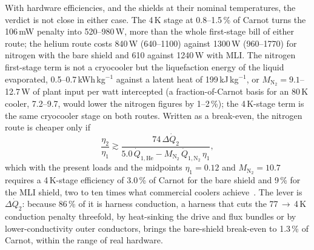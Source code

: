 \documentclass[preprint,12pt]{elsarticle}
\begin{document}
With hardware efficiencies, and the shields at their nominal temperatures, the verdict is not
close in either case. The 4\,K stage at 0.8--1.5\,\% of Carnot turns the 106\,mW penalty into
520--980\,W, more than the whole first-stage bill of either route; the helium route costs
840\,W (640--1100) against 1300\,W (960--1770) for nitrogen with the bare shield and 610
against 1240\,W with MLI. The nitrogen first-stage term is not a cryocooler but the
liquefaction energy of the liquid evaporated, 0.5--0.7\,kWh\,kg$^{-1}$ against a latent heat
of 199\,kJ\,kg$^{-1}$, or $M_{\mathrm{N_2}}=9.1$--12.7\,W of plant input per watt intercepted
(a fraction-of-Carnot basis for an 80\,K cooler, 7.2--9.7, would lower the nitrogen figures by
1--2\,\%); the 4\,K-stage term is the same cryocooler stage on both routes. Written as a
break-even, the nitrogen route is cheaper only if
\begin{equation}
\frac{\eta_2}{\eta_1}\gtrsim\frac{74\,\Delta\dot Q_2}{5.0\,\dot Q_{1,\mathrm{He}}-M_{\mathrm{N_2}}\,\dot Q_{1,\mathrm{N_2}}\,\eta_1},
\label{eq:breakeven}
\end{equation}
which with the present loads and the midpoints $\eta_1=0.12$ and $M_{\mathrm{N_2}}=10.7$
requires a 4\,K-stage efficiency of 3.0\,\% of Carnot for the bare shield and 9\,\% for the
MLI shield, two to ten times what commercial coolers achieve~\cite{Radebaugh2009Cryocoolers}.
The lever is $\Delta\dot Q_2$: because 86\,\% of it is harness conduction, a harness that cuts
the 77\,$\to$\,4\,K conduction penalty threefold, by heat-sinking the drive and flux bundles
or by lower-conductivity outer conductors, brings the bare-shield break-even to 1.3\,\% of
Carnot, within the range of real hardware.
\end{document}
